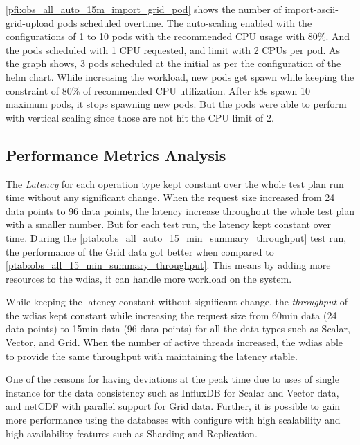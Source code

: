 \documentclass[conference]{IEEEtran}
\newcommand{\dbc}[1]{\todo[author=Dilum, inline, color=blue!40]{#1}}
\begin{document}
\dbc{Some of the figure captions are not very clear.}

\cref{pfi:obs_all_auto_15m_import_grid_pod} shows the number of import-ascii-grid-upload pods scheduled overtime. The auto-scaling enabled with the configurations of 1 to 10 pods with the recommended CPU usage with 80\%. And the pods scheduled with 1 CPU requested, and limit with 2 CPUs per pod.
As the graph shows, 3 pods scheduled at the initial as per the configuration of the helm chart. While increasing the workload, new pods get spawn while keeping the constraint of 80\% of recommended CPU utilization. After \acrshort{k8s} spawn 10 maximum pods, it stops spawning new pods. But the pods were able to perform with vertical scaling since those are not hit the CPU limit of 2.

\subsection{Performance Metrics Analysis}
\label{psubse:performance_metrics}

The \emph{Latency} for each operation type kept constant over the whole test plan run time without any significant change. When the request size increased from 24 data points to 96 data points, the latency increase throughout the whole test plan with a smaller number. But for each test run, the latency kept constant over time.
During the \cref{ptab:obs_all_auto_15_min_summary_throughput} test run, the performance of the Grid data got better when compared to \cref{ptab:obs_all_15_min_summary_throughput}. This means by adding more resources to the \acrshort{wdias}, it can handle more workload on the system.

While keeping the latency constant without significant change, the \emph{throughput} of the \acrshort{wdias} kept constant while increasing the request size from 60min data (24 data points) to 15min data (96 data points) for all the data types such as Scalar, Vector, and Grid.
When the number of active threads increased, the \acrshort{wdias} able to provide the same throughput with maintaining the latency stable.

One of the reasons for having deviations at the peak time due to uses of single instance for the data consistency such as  InfluxDB for Scalar and Vector data, and netCDF with parallel support for Grid data. Further, it is possible to gain more performance using the databases with configure with high scalability and high availability features such as Sharding and Replication.
\end{document}
